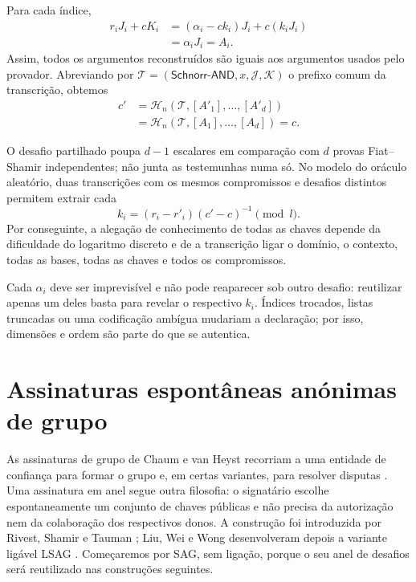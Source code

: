 Para cada índice,
\begin{align*}
r_iJ_i+cK_i
  &=(\alpha_i-ck_i)J_i+c(k_iJ_i)\\
  &=\alpha_iJ_i=A_i.
\end{align*}
Assim, todos os argumentos reconstruídos são iguais aos argumentos usados
pelo provador. Abreviando por
\(\mathcal T=(\mathsf{Schnorr\text{-}AND},x,\mathcal J,\mathcal K)\)
o prefixo comum da transcrição, obtemos
\begin{align*}
c'
 &=\mathcal H_n(\mathcal T,[A'_1],\ldots,[A'_d])\\
 &=\mathcal H_n(\mathcal T,[A_1],\ldots,[A_d])=c.
\end{align*}

O desafio partilhado poupa \(d-1\) escalares em comparação com \(d\) provas
Fiat--Shamir independentes; não junta as testemunhas numa só. No modelo do
oráculo aleatório, duas transcrições com os mesmos compromissos e desafios
distintos permitem extrair cada
\[
k_i=(r_i-r'_i)(c'-c)^{-1}\pmod l.
\]
Por conseguinte, a alegação de conhecimento de todas as chaves depende da
dificuldade do logaritmo discreto e de a transcrição ligar o domínio, o
contexto, todas as bases, todas as chaves e todos os compromissos.

Cada \(\alpha_i\) deve ser imprevisível e não pode reaparecer sob outro
desafio: reutilizar apenas um deles basta para revelar o respectivo \(k_i\).
Índices trocados, listas truncadas ou uma codificação ambígua mudariam a
declaração; por isso, dimensões e ordem são parte do que se autentica.

\section{Assinaturas espontâneas anónimas de grupo}
\label{SAG_section}

As assinaturas de grupo de Chaum e van Heyst recorriam a uma entidade de
confiança para formar o grupo e, em certas variantes, para resolver
disputas \cite{Chaum:1991:GS:1754868.1754897}. Uma assinatura em anel segue
outra filosofia: o signatário escolhe espontaneamente um conjunto de chaves
públicas e não precisa da autorização nem da colaboração dos respectivos
donos. A construção foi introduzida por Rivest, Shamir e Tauman
\cite{rivest-leak-secret}; Liu, Wei e Wong desenvolveram depois a variante
ligável LSAG \cite{Liu2004}. Começaremos por SAG, sem ligação, porque o seu
anel de desafios será reutilizado nas construções seguintes.

